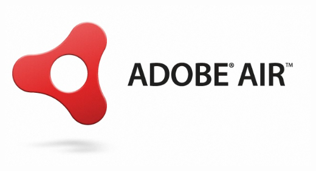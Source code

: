 \documentclass{beamer}
\begin{document}
\begin{frame}
\begin{columns}[c]
\begin{column}{5cm}
        \includegraphics[scale=0.16]{adobe_air_realin.png}

     \end{column}
     \end{columns}
\end{frame}
\end{document}
